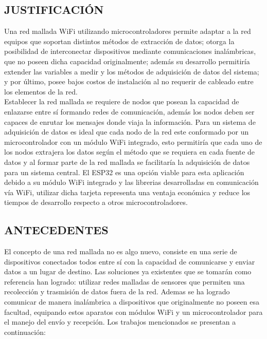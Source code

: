 \documentclass[12pt,letterpaper]{article}
\begin{document}
 \newpage


 \begin{center}
 	\section*{JUSTIFICACIÓN}
 \end{center}

\vspace{1cm}

Una red mallada WiFi utilizando microcontroladores permite adaptar a la red equipos que soportan distintos métodos de extracción de datos; otorga la posibilidad de interconectar dispositivos mediante comunicaciones inalámbricas, que no poseen dicha capacidad originalmente; además su desarrollo permitiría extender las variables a medir y los métodos de adquisición de datos del sistema; y por último, posee bajos costos de instalación al no requerir de cableado entre los elementos de la red. \\

Establecer la red mallada se requiere de nodos que posean la capacidad de enlazarse entre sí formando redes de comunicación, además los nodos deben ser capaces de enrutar los mensajes donde viaja la información. Para un sistema de adquisición de datos es ideal que cada nodo de la red este conformado por un microcontrolador con un módulo WiFi integrado, esto permitiría que cada uno de los nodos extrajera los datos según el método que se requiera en cada fuente de datos y al formar parte de la red mallada se facilitaría la adquisición de datos para un sistema central. El ESP32 es una opción viable para esta aplicación debido a su módulo WiFi integrado y las librerias desarrolladas en comunicación vía WiFi, utilizar dicha tarjeta representa una ventaja económica y reduce los tiempos de desarrollo respecto a otros microcontroladores.

 \newpage


 \begin{center}
 	\section*{ANTECEDENTES}
 \end{center}

\vspace{1cm}

El concepto de una red mallada no es algo nuevo, consiste en una serie de dispositivos conectados todos entre sí con la capacidad de comunicarse y enviar datos a un lugar de destino. Las soluciones ya existentes que se tomarán como referencia han logrado: utilizar redes malladas de sensores que permiten una recolección y trasmisión de datos fuera de la red. Ademas se ha logrado comunicar de manera inalámbrica a dispositivos que originalmente no poseen esa facultad, equipando estos aparatos con módulos WiFi y un microcontrolador para el manejo del envío y recepción. Los trabajos mencionados se presentan a continuación:\\
\end{document}
